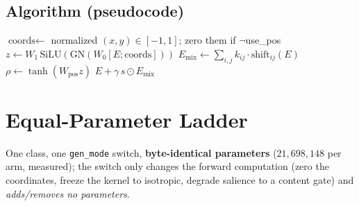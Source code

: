 \documentclass[11pt,a4paper]{article}
\begin{document}
\subsection{Algorithm (pseudocode)}
\begin{algorithm}[h]
\small
{}
\caption{GeoField forward (gen\_mode selects the ladder arm)}
\label{alg:gf}
$\text{coords}\leftarrow$ normalized $(x,y)\in[-1,1]$; zero them if $\neg$use\_pos\;
$z \leftarrow W_1\,\mathrm{SiLU}(\mathrm{GN}(W_0[E;\text{coords}]))$ 
$E_{\text{mix}}\leftarrow \sum_{i,j} k_{ij}\cdot \mathrm{shift}_{ij}(E)$ 
$\rho \leftarrow \tanh(W_{\text{pos}} z)$\;
\Return $E + \gamma\, s \odot E_{\text{mix}}$ 
\end{algorithm}

\section{Equal-Parameter Ladder}
One class, one \texttt{gen\_mode} switch, \textbf{byte-identical parameters} ($21{,}698{,}148$ per arm,
measured); the switch only changes the forward computation (zero the coordinates, freeze the kernel to
isotropic, degrade salience to a content gate) and \emph{adds/removes no parameters}.
\end{document}

